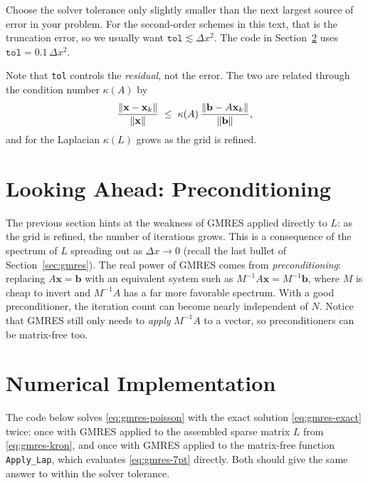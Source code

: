 \begin{remark}
Choose the solver tolerance only slightly smaller than the next largest source
of error in your problem. For the second-order schemes in this text, that is
the truncation error, so we usually want
$\texttt{tol} \lesssim \Delta x^2$. The code in
Section~\ref{sec:gmres-code} uses $\texttt{tol} = 0.1\,\Delta x^2$.
\end{remark}

Note that \texttt{tol} controls the \emph{residual}, not the error. The two
are related through the condition number $\kappa(A)$ by
\begin{equation}
  \frac{\norm{\mathbf{x} - \mathbf{x}_k}}{\norm{\mathbf{x}}}
  \;\le\; \kappa(A)\,
  \frac{\norm{\mathbf{b} - A\mathbf{x}_k}}{\norm{\mathbf{b}}},
  \label{eq:gmres-cond}
\end{equation}
and for the Laplacian $\kappa(L)$ grows as the grid is refined. \section{Looking Ahead: Preconditioning}
\label{sec:gmres-precond-preview}

The previous section hints at the weakness of GMRES applied
directly to $L$: as the grid is refined, the number of iterations grows. This
is a consequence of the spectrum of $L$ spreading out as $\Delta x \to 0$
(recall the last bullet of Section~\ref{sec:gmres}). The real power of GMRES
comes from \emph{preconditioning}: replacing $A\mathbf{x} = \mathbf{b}$ with
an equivalent system such as $M^{-1}A\mathbf{x} = M^{-1}\mathbf{b}$, where $M$
is cheap to invert and $M^{-1}A$ has a far more favorable spectrum. With a good
preconditioner, the iteration count can become nearly independent of $N$.
Notice that GMRES still only needs to \emph{apply} $M^{-1}A$ to a vector, so
preconditioners can be matrix-free too. 


\section{Numerical Implementation}
\label{sec:gmres-code}

The code below solves \eqref{eq:gmres-poisson} with the exact solution
\eqref{eq:gmres-exact} twice: once with GMRES applied to the assembled sparse
matrix $L$ from \eqref{eq:gmres-kron}, and once with GMRES applied to the
matrix-free function \texttt{Apply\_Lap}, which evaluates
\eqref{eq:gmres-7pt} directly. Both should give the same answer to within the
solver tolerance.

